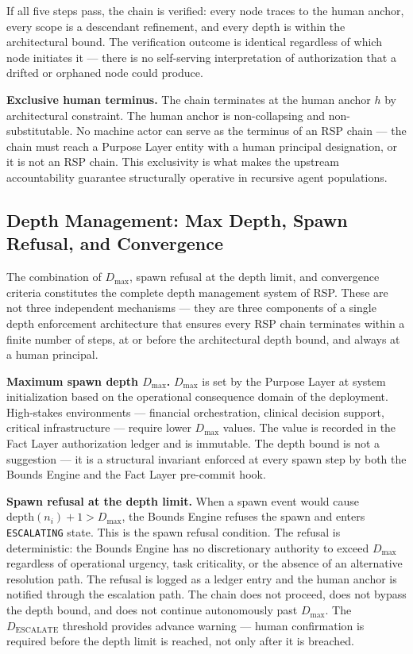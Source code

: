 If all five steps pass, the chain is verified: every node traces to the human anchor, every scope is a descendant refinement, and every depth is within the architectural bound. The verification outcome is identical regardless of which node initiates it — there is no self-serving interpretation of authorization that a drifted or orphaned node could produce.

\medskip
\noindent\textbf{Exclusive human terminus.} The chain terminates at the human anchor $h$ by architectural constraint. The human anchor is non-collapsing and non-substitutable. No machine actor can serve as the terminus of an RSP chain — the chain must reach a Purpose Layer entity with a human principal designation, or it is not an RSP chain. This exclusivity is what makes the \bxthree{} upstream accountability guarantee structurally operative in recursive agent populations.

\subsection{Depth Management: Max Depth, Spawn Refusal, and Convergence}
\label{sec:rs-depth-mgmt}

The combination of $D_{\max}$, spawn refusal at the depth limit, and convergence criteria constitutes the complete depth management system of RSP. These are not three independent mechanisms — they are three components of a single depth enforcement architecture that ensures every RSP chain terminates within a finite number of steps, at or before the architectural depth bound, and always at a human principal.

\medskip
\noindent\textbf{Maximum spawn depth $D_{\max}$.} $D_{\max}$ is set by the Purpose Layer at system initialization based on the operational consequence domain of the deployment. High-stakes environments — financial orchestration, clinical decision support, critical infrastructure — require lower $D_{\max}$ values. The value is recorded in the Fact Layer authorization ledger and is immutable. The depth bound is not a suggestion — it is a structural invariant enforced at every spawn step by both the Bounds Engine and the Fact Layer pre-commit hook.

\medskip
\noindent\textbf{Spawn refusal at the depth limit.} When a spawn event would cause $\text{depth}(n_i) + 1 > D_{\max}$, the Bounds Engine refuses the spawn and enters \texttt{ESCALATING} state. This is the spawn refusal condition. The refusal is deterministic: the Bounds Engine has no discretionary authority to exceed $D_{\max}$ regardless of operational urgency, task criticality, or the absence of an alternative resolution path. The refusal is logged as a ledger entry and the human anchor is notified through the escalation path. The chain does not proceed, does not bypass the depth bound, and does not continue autonomously past $D_{\max}$. The $D_{\text{ESCALATE}}$ threshold provides advance warning — human confirmation is required before the depth limit is reached, not only after it is breached.

